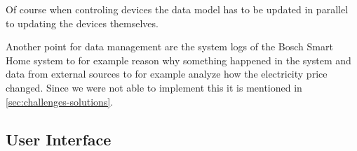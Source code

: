 Of course when controling devices the data model has to be updated in parallel to updating the devices themselves.

Another point for data management are the system logs of the Bosch Smart Home system to for example reason why something happened in the system and data from external sources to for example analyze how the electricity price changed.
Since we were not able to implement this it is mentioned in \cref{sec:challenges-solutions}.


\subsection{User Interface}
\label{sec:ui}

